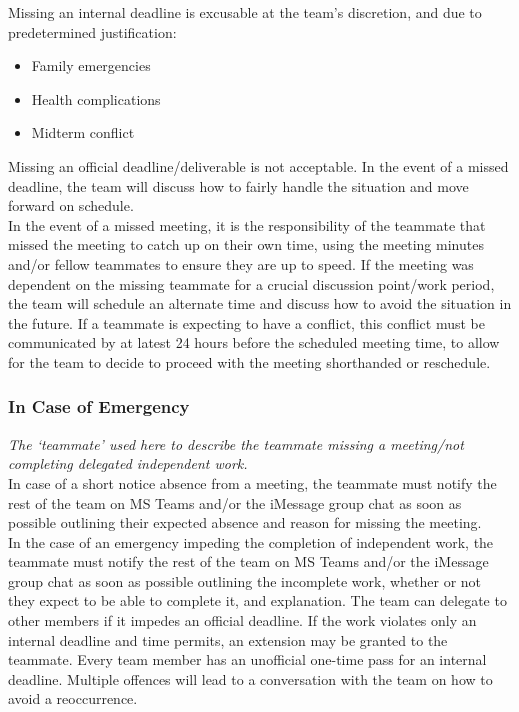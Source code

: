 \documentclass{article}
\begin{document}
Missing an internal deadline is excusable at the team’s discretion, and due to predetermined justification: 
\begin{itemize}
    \item Family emergencies 
    \item Health complications 
    \item Midterm conflict  \\
\end{itemize} 

Missing an official deadline/deliverable is not acceptable. In the event of a missed deadline, the team will discuss how to fairly handle the situation and move forward on schedule.  \\

In the event of a missed meeting, it is the responsibility of the teammate that missed the meeting to catch up on their own time, using the meeting minutes and/or fellow teammates to ensure they are up to speed. If the meeting was dependent on the missing teammate for a crucial discussion point/work period, the team will schedule an alternate time and 	discuss how to avoid the situation in the future. If a teammate is expecting to have a conflict, this conflict must be communicated by at latest 24 hours before the scheduled meeting time, to allow for the team to decide to proceed with the meeting shorthanded or reschedule. \\

\subsubsection*{In Case of Emergency}

\textit{The ‘teammate’ used here to describe the teammate missing a meeting/not completing delegated independent work.} \\
 
In case of a short notice absence from a meeting, the teammate must notify the rest of the team on MS Teams and/or the iMessage group chat as soon as possible outlining their expected absence and reason for missing the meeting.  \\

In the case of an emergency impeding the completion of independent work, the teammate must notify the rest of the team on MS Teams and/or the iMessage group chat as soon as possible outlining the incomplete work, whether or not they expect to be able to complete it, and explanation. The team can delegate to other members if it impedes an official deadline. If the work violates only an internal deadline and time permits, an extension may be granted to the teammate. Every team member has an unofficial one-time pass for an internal deadline. Multiple offences will lead to a conversation with the team on how to avoid a reoccurrence. 
\end{document}
